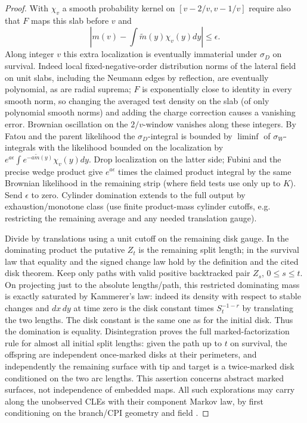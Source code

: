 \begin{proof}
With \(\chi_v\) a smooth probability kernel on \([v-2/v,v-1/v]\) require also that \(F\) maps this slab before \(v\) and
\[
 |m(v)-\int\tilde m(y)\chi_v(y)dy|\le\epsilon .
\]
Along integer \(v\) this extra localization is eventually immaterial under \(\sigma_D\) on survival.
Indeed local fixed-negative-order distribution norms of the lateral field on unit slabs, including the Neumann edges by reflection, are eventually polynomial, as are radial suprema; \(F\) is exponentially close to identity in every smooth norm, so changing the averaged test density on the slab (of only polynomial smooth norms) and adding the charge correction causes a vanishing error.
Brownian oscillation on the \(2/v\)-window vanishes along these integers.
By Fatou and the parent likelihood the \(\sigma_D\)-integral is bounded by \(\liminf\) of \(\sigma_W\)-integrals with the likelihood bounded on the localization by \(e^{a\epsilon}\int e^{-a\tilde m(y)}\chi_v(y)dy\).
Drop localization on the latter side; Fubini and the precise wedge product give \(e^{a\epsilon}\) times the claimed product integral by the same Brownian likelihood in the remaining strip (where field tests use only up to \(K\)).
Send \(\epsilon\) to zero.
Cylinder domination extends to the full output by exhaustion/monotone class (use finite product-mass cylinder cutoffs, e.g. restricting the remaining average and any needed translation gauge).


Divide by translations using a unit cutoff on the remaining disk gauge.
In the dominating product the putative \(Z_t\) is the remaining split length; in the survival law that equality and the signed change law hold by the definition and the cited disk theorem.
Keep only paths with valid positive backtracked pair \(Z_s\), \(0\le s\le t\).
On projecting just to the absolute lengths/path, this restricted dominating mass is exactly saturated by Kammerer's law: indeed its density with respect to stable changes and \(dx\,dy\) at time zero is the disk constant times \(S_t^{-1-r}\) by translating the two lengths.
The disk constant is the same one as for the initial disk.
Thus the domination is equality.
Disintegration proves the full marked-factorization rule for almost all initial split lengths: given the path up to \(t\) on survival, the offspring are independent once-marked disks at their perimeters, and independently the remaining surface with tip and target is a twice-marked disk conditioned on the two arc lengths.
This assertion concerns abstract marked surfaces, not independence of embedded maps.
All such explorations may carry along the unobserved CLEs with their component Markov law, by first conditioning on the branch/CPI geometry and field \citep[Proposition~3.6, version~5]{Kammerer}.


\end{proof}
